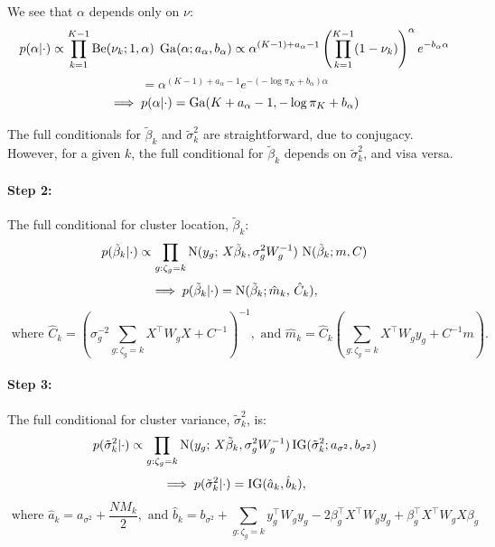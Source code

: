 We see that $\alpha$ depends only on $\nu$:
\begin{equation}
    p(\alpha|\cdot) \propto \prod_{k=1}^{K-1} \operatorname{Be}(\nu_k;1, \alpha) \; \operatorname{Ga}(\alpha;a_\alpha,b_\alpha)
\propto \alpha^{(K-1) + a_\alpha - 1} \left(\prod_{k=1}^{K-1} (1-\nu_k)\right)^\alpha e^{-b_\alpha \alpha} 
  \end{equation}
  \begin{equation*}
    = \alpha^{(K-1) + a_\alpha - 1} e^{-(-\log \pi_K + b_\alpha) \alpha}
  \end{equation*}
  \begin{equation*}
    \implies p(\alpha|\cdot) = \operatorname{Ga}(K + a_\alpha - 1, -\log \pi_K + b_\alpha)
  \end{equation*}



The full conditionals for $\tilde{\beta}_k$ and $\tilde{\sigma}^2_k$ are straightforward, due to conjugacy. However, for a given $k$, the full conditional for $\tilde{\beta}_k$ depends on $\tilde{\sigma}^2_k$, and visa versa.

\paragraph{Step 2:} 
The full conditional for cluster location, $\tilde{\beta}_k$:
    \begin{equation}
      p(\tilde{\beta}_k|\cdot) \propto \prod_{g:\zeta_g=k} \operatorname{N}(y_g;\,X\tilde{\beta}_k, \sigma^2_gW^{-1}_g)\,\operatorname{N}(\tilde{\beta}_k; m, C)
    \end{equation}
    \begin{equation*}
      \implies p(\tilde{\beta}_k|\cdot) = \operatorname{N}(\tilde{\beta}_k; \hat{m}_k,\, \hat{C}_k),
    \end{equation*}
    \begin{equation*}
    \mbox{ where }\hat{C}_k= \left( \sigma^{-2}_g\sum_{g:\zeta_g=k}
      X^\top W_g X + C^{-1} \right)^{-1}, \mbox{ and
    }\hat{m}_k=\hat{C}_k \left(\sum_{g:\zeta_g=k} X^\top W_g y_g +
      C^{-1}m \right).
    \end{equation*}
\paragraph{Step 3:} The full conditional for cluster variance, $\tilde{\sigma}_k^2$, is:
    \begin{equation}
      p(\tilde{\sigma}_k^2|\cdot) \propto \prod_{g:\zeta_g=k}
      \operatorname{N}(y_g;\,X\tilde{\beta}_k, \sigma^2_gW^{-1}_g)
      \operatorname{IG}(\tilde{\sigma}_k^2; a_{\sigma^2},b_{\sigma^2})
    \end{equation}
    \begin{equation*}
      \implies p(\tilde{\sigma}_k^2|\cdot) = \operatorname{IG}(\hat{a}_k,\hat{b}_k), 
    \end{equation*}
    \begin{equation*}
      \mbox{ where }\hat{a}_k = a_{\sigma^2} + \frac{NM_k}{2},\mbox{ and }\hat{b}_k= b_{\sigma^2} + \sum_{g:\zeta_g=k}y_g^\top W_g y_g -2 \beta_g^\top X^\top W_g y_g  +\beta_g^\top X^\top W_g X \beta_g
    \end{equation*}

